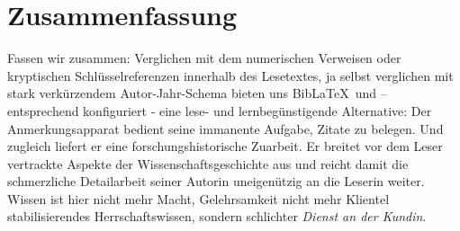 
\section{Zusammenfassung}

Fassen wir zusammen: Verglichen mit dem numerischen Verweisen oder kryptischen Schlüsselreferenzen innerhalb des Lesetextes, ja selbst verglichen mit stark verkürzendem Autor-Jahr-Schema bieten uns Bib\LaTeX\ und  -- entsprechend konfiguriert - eine lese- und lernbegünstigende Alternative: Der Anmerkungsapparat bedient seine immanente Aufgabe, Zitate zu belegen. Und zugleich liefert er eine forschungshistorische Zuarbeit. Er breitet vor dem Leser vertrackte Aspekte der Wissenschaftsgeschichte aus und reicht damit die schmerzliche Detailarbeit seiner Autorin uneigenützig an die Leserin weiter. Wissen ist hier nicht mehr Macht, Gelehrsamkeit nicht mehr Klientel stabilisierendes Herrschaftswissen, sondern schlichter \emph{Dienst an der Kundin}.
